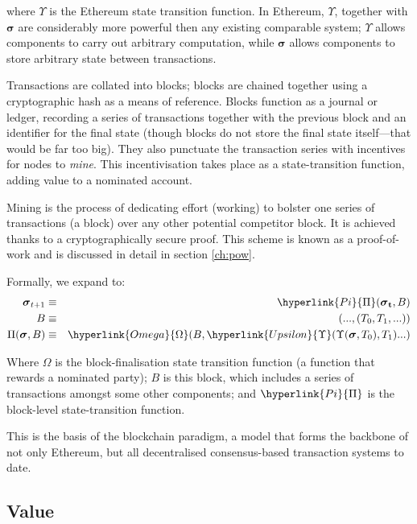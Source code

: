 \documentclass[9pt,oneside]{amsart}
\begin{document}
\begin{multicols}{2}
where $\Upsilon$ is the Ethereum state transition function. In Ethereum, $\Upsilon$, together with $\boldsymbol{\sigma}$ are considerably more powerful then any existing comparable system; $\Upsilon$ allows components to carry out arbitrary computation, while $\boldsymbol{\sigma}$ allows components to store arbitrary state between transactions.

Transactions are collated into blocks; blocks are chained together using a cryptographic hash as a means of reference. Blocks function as a journal or ledger, recording a series of transactions together with the previous block and an identifier for the final state (though blocks do not store the final state itself---that would be far too big). They also punctuate the transaction series with incentives for nodes to \textit{mine}. This incentivisation takes place as a state-transition function, adding value to a nominated account.

Mining is the process of dedicating effort (working) to bolster one series of transactions (a block) over any other potential competitor block. It is achieved thanks to a cryptographically secure proof. This scheme is known as a proof-of-work and is discussed in detail in section \ref{ch:pow}.

Formally, we expand to:
\begin{eqnarray}
\boldsymbol{\sigma}_{t+1} & \equiv & \hyperlink{Pi}{\Pi}(\boldsymbol{\sigma}_\mathbf{t}, B) \\
B & \equiv & (..., (T_0, T_1, ...) ) \\
\Pi(\boldsymbol{\sigma}, B) & \equiv & \hyperlink{Omega}{\Omega}(B, \hyperlink{Upsilon}{\Upsilon}(\Upsilon(\boldsymbol{\sigma}, T_0), T_1) ...)
\end{eqnarray}

Where \hyperlink{Omega}{$\Omega$} is the block-finalisation state transition function (a function that rewards a nominated party); $B$ is this block, which includes a series of transactions amongst some other components; and $\hyperlink{Pi}{\Pi}$ is the block-level state-transition function.

This is the basis of the blockchain paradigm, a model that forms the backbone of not only Ethereum, but all decentralised consensus-based transaction systems to date.

\subsection{Value}


\end{multicols}
\end{document}
